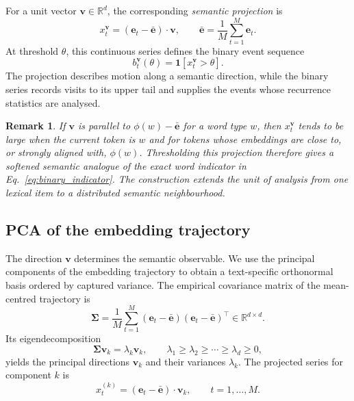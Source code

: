 \documentclass[preprint]{elsarticle}
\newtheorem{remark}{Remark}
\newcommand{\lk}{\lambda_k}
\newcommand{\xtk}{x_t^{(k)}}
\newcommand{\vk}{\mathbf{v}_k}
\newcommand{\et}{\mathbf{e}_t}
\newcommand{\ebar}{\bar{\mathbf{e}}}
\newcommand{\Sig}{\boldsymbol{\Sigma}}
\newcommand{\R}{\mathbb{R}}
\begin{document}
For a unit vector $\mathbf{v}\in\R^d$, the corresponding
\emph{semantic projection} is
\begin{equation}
  x_t^{\mathbf{v}}=(\et-\ebar)\cdot\mathbf{v},
  \qquad
  \ebar=\frac{1}{M}\sum_{t=1}^M\et.
  \label{eq:projection}
\end{equation}
At threshold $\theta$, this continuous series defines the binary event
sequence
\begin{equation}
  b_t^{\mathbf{v}}(\theta)
  =\mathbf{1}\!\left[x_t^{\mathbf{v}}>\theta\right].
  \label{eq:binary_from_proj}
\end{equation}
The projection describes motion along a semantic direction, while the
binary series records visits to its upper tail and supplies the events
whose recurrence statistics are analysed.

\begin{remark}
  If $\mathbf{v}$ is parallel to $\phi(w)-\ebar$ for a word type $w$,
  then $x_t^{\mathbf{v}}$ tends to be large when the current token is
  $w$ and for tokens whose embeddings are close to, or strongly aligned
  with, $\phi(w)$.
  Thresholding this projection therefore gives a softened semantic
  analogue of the exact word indicator in
  Eq.~\eqref{eq:binary_indicator}.
  The construction extends the unit of analysis from one lexical item to
  a distributed semantic neighbourhood.
\end{remark}

\subsection{PCA of the embedding trajectory}
\label{sec:pca}

The direction $\mathbf{v}$ determines the semantic observable.
We use the principal components of the embedding trajectory to obtain a
text-specific orthonormal basis ordered by captured variance.
The empirical covariance matrix of the mean-centred trajectory is
\begin{equation}
  \Sig=
  \frac{1}{M}\sum_{t=1}^M
  (\et-\ebar)(\et-\ebar)^\top
  \in\R^{d\times d}.
  \label{eq:covariance}
\end{equation}
Its eigendecomposition
\begin{equation}
  \Sig\vk=\lk\vk,
  \qquad
  \lambda_1\geq\lambda_2\geq\cdots\geq\lambda_d\geq0,
  \label{eq:pca_eigenproblem}
\end{equation}
yields the principal directions $\vk$ and their variances $\lk$.
The projected series for component $k$ is
\begin{equation}
  \xtk=(\et-\ebar)\cdot\vk,
  \qquad t=1,\ldots,M.
  \label{eq:proj_series}
\end{equation}
\end{document}
